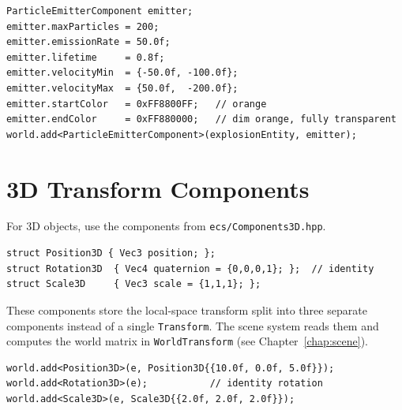 \begin{lstlisting}
ParticleEmitterComponent emitter;
emitter.maxParticles = 200;
emitter.emissionRate = 50.0f;
emitter.lifetime     = 0.8f;
emitter.velocityMin  = {-50.0f, -100.0f};
emitter.velocityMax  = {50.0f,  -200.0f};
emitter.startColor   = 0xFF8800FF;   // orange
emitter.endColor     = 0xFF880000;   // dim orange, fully transparent
world.add<ParticleEmitterComponent>(explosionEntity, emitter);
\end{lstlisting}

\section{3D Transform Components}

For 3D objects, use the components from \texttt{ecs/Components3D.hpp}.

\begin{lstlisting}
struct Position3D { Vec3 position; };
struct Rotation3D  { Vec4 quaternion = {0,0,0,1}; };  // identity
struct Scale3D     { Vec3 scale = {1,1,1}; };
\end{lstlisting}

These components store the local-space transform split into three separate
components instead of a single \texttt{Transform}. The scene system reads
them and computes the world matrix in \texttt{WorldTransform} (see
Chapter~\ref{chap:scene}).

\begin{lstlisting}
world.add<Position3D>(e, Position3D{{10.0f, 0.0f, 5.0f}});
world.add<Rotation3D>(e);           // identity rotation
world.add<Scale3D>(e, Scale3D{{2.0f, 2.0f, 2.0f}});
\end{lstlisting}

